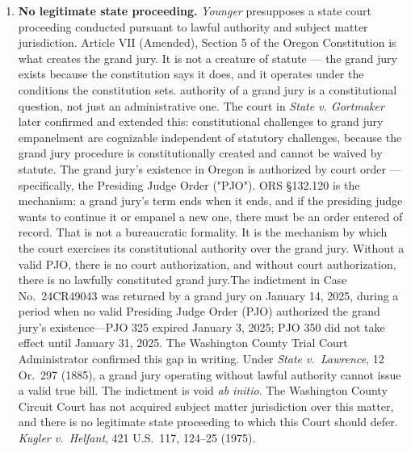 \documentclass[12pt,letterpaper]{article}
\newenvironment{subparas}{%
	\begin{enumerate}[label=\alph*.,leftmargin=0.75in,itemsep=0pt,%
		parsep=0pt,topsep=4pt]%
	}{%
	\end{enumerate}%
}
\begin{document}
	\begin{subparas}
		
		\item \textbf{No legitimate state proceeding.} \textit{Younger} presupposes a state court proceeding conducted
		pursuant to lawful authority and subject matter jurisdiction.  Article VII (Amended), Section 5 of the Oregon Constitution is what creates the grand jury. It is not a creature of statute — the grand jury exists because the constitution says it does, and it operates under the conditions the constitution sets. authority of a grand jury is a constitutional question, not just an administrative one.  The court in \textit{State v. Gortmaker} later confirmed and extended this: constitutional challenges to grand jury empanelment are cognizable independent of statutory challenges, because the grand jury procedure is constitutionally created and cannot be waived by statute. The grand jury's existence in Oregon is authorized by court order — specifically, the Presiding Judge Order ("PJO"). ORS \S132.120 is the mechanism: a grand jury's term ends when it ends, and if the presiding judge wants to continue it or empanel a new one, there must be an order entered of record. That is not a bureaucratic formality. It is the mechanism by which the court exercises its constitutional authority over the grand jury. Without a valid PJO, there is no court authorization, and without court authorization, there is no lawfully constituted grand jury.The
		indictment in Case No.\ 24CR49043 was returned by a grand jury on
		January 14, 2025, during a period when no valid Presiding Judge Order
		(PJO) authorized the grand jury's existence---PJO 325 expired
		January 3, 2025; PJO 350 did not take effect until January 31, 2025.
		The Washington County Trial Court Administrator confirmed this gap in
		writing. Under \textit{State v.\ Lawrence}, 12 Or.\ 297 (1885), a
		grand jury operating without lawful authority cannot issue a valid
		true bill. The indictment is void \textit{ab initio}. The
		Washington County Circuit Court has not acquired subject matter
		jurisdiction over this matter, and there is no legitimate state
		proceeding to which this Court should defer.
		\textit{Kugler v.\ Helfant}, 421 U.S.\ 117, 124--25 (1975).
		

\end{subparas}
\end{document}
